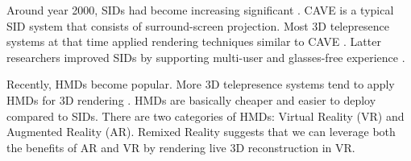 Around year 2000, SIDs had become increasing significant \cite{gross2003blue}. CAVE \cite{cruz1993surround} is a typical SID system that consists of surround-screen projection. Most 3D telepresence systems at that time applied rendering techniques similar to CAVE \cite{gibbs1999teleport, towles20023d, kurillo2008immersive, benko2012miragetable}. Latter researchers improved SIDs by supporting multi-user \cite{frohlich2005implementing, kulik2011c1x6, guan2018two} and glasses-free experience \cite{benko2014dyadic, jones2014roomalive, pejsa2016room2room}.


Recently, HMDs become popular. More 3D telepresence systems tend to apply HMDs for 3D rendering \cite{orts2016holoportation, maimone2013general, lindlbauer2018remixed, smith2018communication}. HMDs are basically cheaper and easier to deploy compared to SIDs. There are two categories of HMDs: Virtual Reality (VR) and Augmented Reality (AR). Remixed Reality \cite{lindlbauer2018remixed} suggests that we can leverage both the benefits of AR and VR by rendering live 3D reconstruction in VR.





